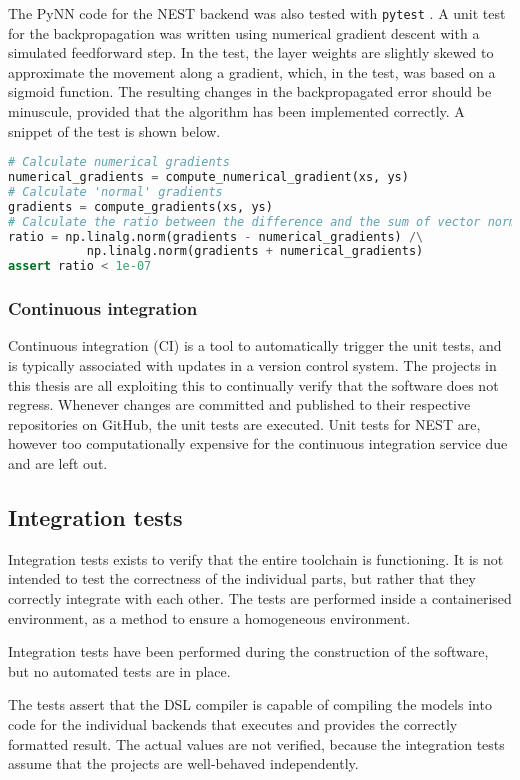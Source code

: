 The PyNN code for the NEST backend was also tested with \texttt{pytest}
\cite{Pytest2018}.
A unit test for the backpropagation was written using numerical gradient descent
with a simulated feedforward step.
In the test, the layer weights are slightly skewed to approximate the movement
along a gradient, which, in the test, was based on a sigmoid function.
The resulting changes in the backpropagated error should be minuscule, provided
that the algorithm has been implemented correctly.
A snippet of the test is shown below.

\begin{minipage}{\linewidth}
\begin{lstlisting}[language=Python,label={lst:volrpynn_numerical},caption={Part
of the numerical gradient test for the densely connected layer in PyNN.}]
# Calculate numerical gradients
numerical_gradients = compute_numerical_gradient(xs, ys)
# Calculate 'normal' gradients
gradients = compute_gradients(xs, ys)
# Calculate the ratio between the difference and the sum of vector norms
ratio = np.linalg.norm(gradients - numerical_gradients) /\
           np.linalg.norm(gradients + numerical_gradients)
assert ratio < 1e-07
\end{lstlisting}
\end{minipage}

\subsubsection{Continuous integration}
Continuous integration (CI) is a tool to automatically trigger the unit tests, and is
typically associated with updates in a version control system. \index{Continuous
integration}
The projects in this thesis are all exploiting this to continually verify that
the software does not regress.
Whenever changes are committed and published to their respective repositories on
GitHub, the unit tests are executed.
Unit tests for NEST are, however too computationally expensive for the
continuous integration service due and are left out.

\subsection{Integration tests}
Integration tests exists to verify that the entire toolchain is functioning.
It is not intended to test the correctness of the individual parts, but rather
that they correctly integrate with each other.
The tests are performed inside a containerised environment, as a
method to ensure a homogeneous environment. 

Integration tests have been performed during the construction of the software,
but no automated tests are in place.

The tests assert that the \gls{DSL} compiler is capable of compiling the models
into code for the individual backends that executes and provides the correctly
formatted result.
The actual values are not verified, because the integration tests assume that
the projects are well-behaved independently.

